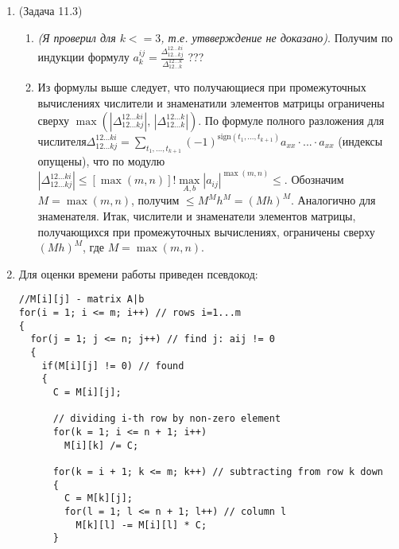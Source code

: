 \documentclass[a4paper]{article}
\begin{document}
\begin{enumerate}
\begin{enumerate}
\item (Задача 11.3)
\begin{enumerate}
\item {\em (Я проверил для $k<=3$, т.е. утвверждение не доказано)}. Получим по индукции формулу $a_k^{ij}=\frac{\Delta^{12...ki}_{12...kj}}{\Delta^{12...k}_{12...k}}$ ??? %
\item Из формулы выше следует, что получающиеся при промежуточных вычислениях числители и знаменатили элементов матрицы ограничены сверху $\max(|\Delta^{12...ki}_{12...kj}|,\,|\Delta^{12...k}_{12...k}|)$. По формуле полного разложения для числителя\newline $\Delta^{12...ki}_{12...kj}=\sum\limits_{t_1,...,t_{k+1}}(-1)^{\mbox{sign}(t_1,...,t_{k+1})}a_{xx}\cdot...\cdot a_{xx}$ (индексы опущены), что по модулю\newline $|\Delta^{12...ki}_{12...kj}|\leqslant [\max({m,n})]!\max\limits_{A,b}|a_{ij}|^{\max(m,n)}\boxed{\leqslant}$. Обозначим $M=\max(m,n)$, получим $\boxed{\leqslant}M^Mh^M=(Mh)^M$. Аналогично для знаменателя.\newline
Итак, числители и знаменатели элементов матрицы, получающихся при промежуточных вычислениях, ограничены сверху $(Mh)^M$, где $M=\max(m,n)$.
\end{enumerate}
\item Для оценки времени работы приведен псевдокод:

%
%

\begin{lstlisting}
//M[i][j] - matrix A|b
for(i = 1; i <= m; i++) // rows i=1...m
{
  for(j = 1; j <= n; j++) // find j: aij != 0
  {
    if(M[i][j] != 0) // found
    {
      C = M[i][j];

      // dividing i-th row by non-zero element
      for(k = 1; i <= n + 1; i++)
        M[i][k] /= C;

      for(k = i + 1; k <= m; k++) // subtracting from row k down
      {
        C = M[k][j];
        for(l = 1; l <= n + 1; l++) // column l
          M[k][l] -= M[i][l] * C;
      }
      

\end{lstlisting}
\end{enumerate}
\end{enumerate}
\end{document}
